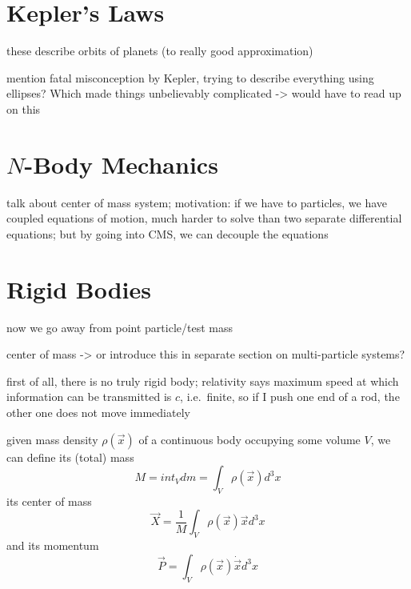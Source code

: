 \documentclass[../class_mech_main.tex]{subfiles}
\begin{document}
    \section{Kepler's Laws}

these describe orbits of planets (to really good approximation)


mention fatal misconception by Kepler, trying to describe everything using ellipses? Which made things unbelievably complicated -> would have to read up on this



\newpage



	\section{$N$-Body Mechanics}
talk about center of mass system; motivation: if we have to particles, we have coupled equations of motion, much harder to solve than two separate differential equations; but by going into CMS, we can decouple the equations



\newpage



    \section{Rigid Bodies}

now we go away from point particle/test mass


center of mass -> or introduce this in separate section on multi-particle systems?



first of all, there is no truly rigid body; relativity says maximum speed at which information can be transmitted is $c$, i.e.~finite, so if I push one end of a rod, the other one does not move immediately




given mass density $\rho(\vec{x})$ of a continuous body occupying some volume $V$, we can define its (total) mass
\begin{equation}
	M = int_V dm
	= \int_V \rho(\vec{x}) d^3x
\end{equation}
its center of mass
\begin{equation}
	\vec{X} = \frac{1}{M} \int_V \rho(\vec{x}) \vec{x} d^3x
\end{equation}
and its momentum
\begin{equation}
	\vec{P} = \int_V \rho(\vec{x}) \dot{\vec{x}} d^3x
\end{equation}
\end{document}
